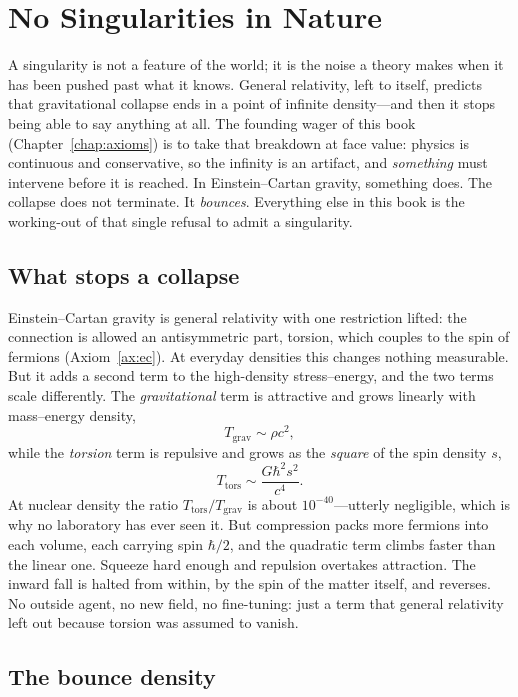 \chapter{No Singularities in Nature}
\label{chap:bounce}

A singularity is not a feature of the world; it is the noise a theory makes when
it has been pushed past what it knows. General relativity, left to itself,
predicts that gravitational collapse ends in a point of infinite density---and
then it stops being able to say anything at all. The founding wager of this book
(Chapter~\ref{chap:axioms}) is to take that breakdown at face value: physics is
continuous and conservative, so the infinity is an artifact, and \emph{something}
must intervene before it is reached. In Einstein--Cartan gravity, something does.
The collapse does not terminate. It \emph{bounces}. Everything else in this book
is the working-out of that single refusal to admit a singularity.

\section{What stops a collapse}

Einstein--Cartan gravity is general relativity with one restriction lifted: the
connection is allowed an antisymmetric part, torsion, which couples to the spin
of fermions (Axiom~\ref{ax:ec}). At everyday densities this changes nothing
measurable. But it adds a second term to the high-density stress--energy, and the
two terms scale differently. The \emph{gravitational} term is attractive and
grows linearly with mass--energy density,
\[
  T_{\mathrm{grav}} \sim \rho c^2 ,
\]
while the \emph{torsion} term is repulsive and grows as the \emph{square} of the
spin density $s$,
\[
  T_{\mathrm{tors}} \sim \frac{G\hbar^2 s^2}{c^4} .
\]
At nuclear density the ratio $T_{\mathrm{tors}}/T_{\mathrm{grav}}$ is about
$10^{-40}$---utterly negligible, which is why no laboratory has ever seen it. But
compression packs more fermions into each volume, each carrying spin $\hbar/2$,
and the quadratic term climbs faster than the linear one. Squeeze hard enough and
repulsion overtakes attraction. The inward fall is halted from within, by the
spin of the matter itself, and reverses. No outside agent, no new field, no
fine-tuning: just a term that general relativity left out because torsion was
assumed to vanish.

\section{The bounce density}
\label{sec:bounce-density}

